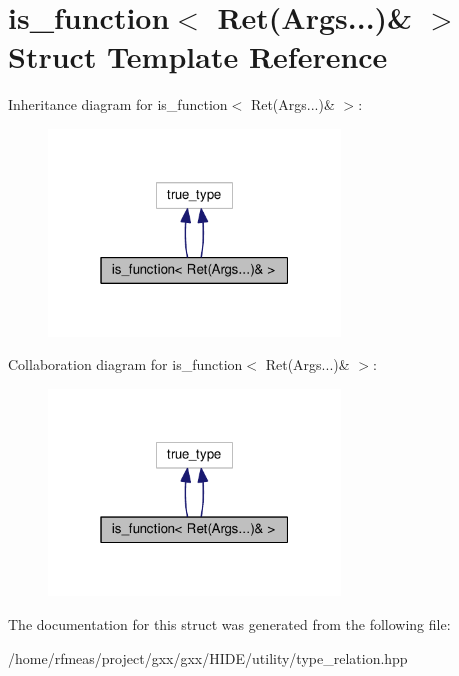 \hypertarget{structis__function_3_01Ret_07Args_8_8_8_08_6_01_4}{}\section{is\+\_\+function$<$ Ret(Args...)\& $>$ Struct Template Reference}
\label{structis__function_3_01Ret_07Args_8_8_8_08_6_01_4}


Inheritance diagram for is\+\_\+function$<$ Ret(Args...)\& $>$\+:
\nopagebreak
\begin{figure}[H]
\begin{center}
\leavevmode
\includegraphics[width=220pt]{structis__function_3_01Ret_07Args_8_8_8_08_6_01_4__inherit__graph}
\end{center}
\end{figure}


Collaboration diagram for is\+\_\+function$<$ Ret(Args...)\& $>$\+:
\nopagebreak
\begin{figure}[H]
\begin{center}
\leavevmode
\includegraphics[width=220pt]{structis__function_3_01Ret_07Args_8_8_8_08_6_01_4__coll__graph}
\end{center}
\end{figure}


The documentation for this struct was generated from the following file\+:\begin{DoxyCompactItemize}
\item 
/home/rfmeas/project/gxx/gxx/\+H\+I\+D\+E/utility/type\+\_\+relation.\+hpp\end{DoxyCompactItemize}
